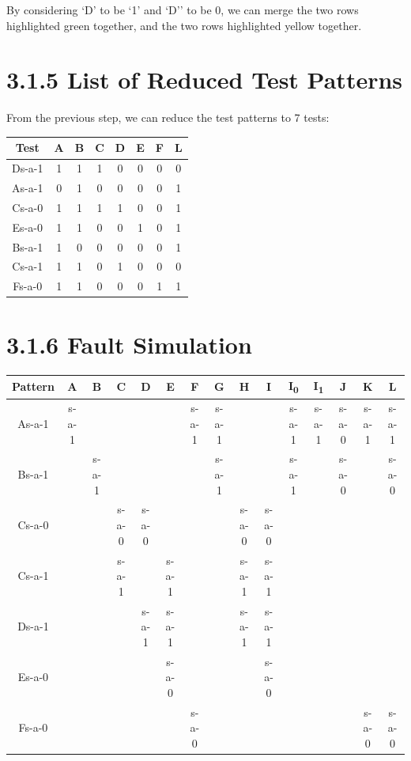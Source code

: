 \documentclass[11pt]{report}
\begin{document}
By considering `D' to be `1' and `D'' to be 0, we can merge the two rows highlighted green together, and the two rows highlighted yellow together.


\section*{3.1.5 List of Reduced Test Patterns}
From the previous step, we can reduce the test patterns to 7 tests:

\begin{tabular}{|c||c|c|c|c|c|c|c|}
\hline
Test & A & B & C & D & E & F & L \\
\hline
\hline
Ds-a-1 & 1 & 1 & 1 & 0 & 0 & 0 & 0 \\
\hline
As-a-1 & 0 & 1 & 0 & 0 & 0 & 0 & 1 \\
\hline
Cs-a-0 & 1 & 1 & 1 & 1 & 0 & 0 & 1 \\
\hline
Es-a-0 & 1 & 1 & 0 & 0 & 1 & 0 & 1 \\
\hline
Bs-a-1 & 1 & 0 & 0 & 0 & 0 & 0 & 1 \\
\hline
Cs-a-1 & 1 & 1 & 0 & 1 & 0 & 0 & 0 \\
\hline
Fs-a-0 & 1 & 1 & 0 & 0 & 0 & 1 & 1 \\
\hline
\end{tabular}


\section*{3.1.6 Fault Simulation}
\begin{tabular}{|c||c|c|c|c|c|c|c|c|c|c|c|c|c|c|}
\hline
Pattern & A & B & C & D & E & F & G & H & I & I\textsubscript{0} & I\textsubscript{1} & J & K & L \\
\hline
\hline
As-a-1 & s-a-1 & & & & & s-a-1 & s-a-1 & & & s-a-1 & s-a-1 & s-a-0 & s-a-1 & s-a-1 \\
\hline
Bs-a-1 & & s-a-1 & & & & & s-a-1 & & & s-a-1 & & s-a-0 & & s-a-0 \\
\hline
Cs-a-0 & & & s-a-0 & s-a-0 & & & & s-a-0 & s-a-0 & & & & & \\
\hline
Cs-a-1 & & & s-a-1 & & s-a-1 & & & s-a-1 & s-a-1 & & & & & \\
\hline
Ds-a-1 & & & & s-a-1 & s-a-1 & & & s-a-1 & s-a-1 & & & & & \\
\hline
Es-a-0 & & & & & s-a-0 & & & & s-a-0 & & & & & \\
\hline
Fs-a-0 & & & & & & s-a-0 & & & & & & & s-a-0 & s-a-0 \\
\hline
\end{tabular}
\end{document}
